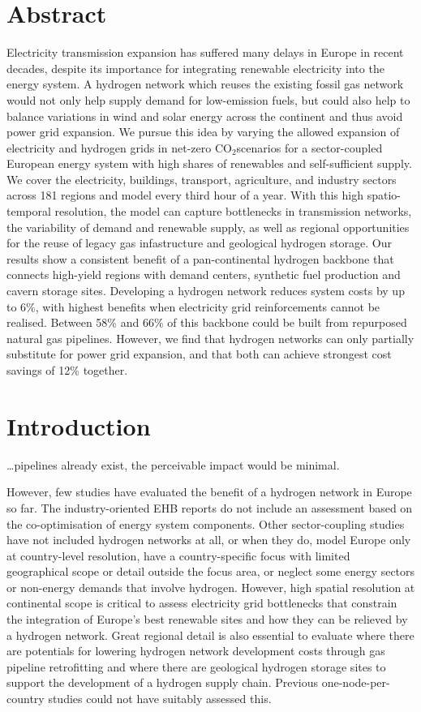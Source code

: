 \documentclass{article}
\def\co{CO${}_2$}
\begin{document}
\section*{Abstract}

Electricity transmission expansion has suffered many delays in Europe in recent
decades, despite its importance for integrating renewable electricity into the
energy system. A hydrogen network which reuses the existing fossil gas network
would not only help supply demand for low-emission fuels, but could also help to
balance variations in wind and solar energy across the continent and thus avoid
power grid expansion. We pursue this idea by varying the allowed expansion of
electricity and hydrogen grids in net-zero \co scenarios for a sector-coupled
European energy system with high shares of renewables and self-sufficient
supply. We cover the electricity, buildings, transport, agriculture, and
industry sectors across 181 regions and model every third hour of a year. With
this high spatio-temporal resolution, the model can capture bottlenecks in
transmission networks, the variability of demand and renewable supply, as well
as regional opportunities for the reuse of legacy gas infastructure and
geological hydrogen storage. Our results show a consistent benefit of a
pan-continental hydrogen backbone that connects high-yield regions with demand
centers, synthetic fuel production and cavern storage sites. Developing a
hydrogen network reduces system costs by up to 6\%, with highest benefits when
electricity grid reinforcements cannot be realised. Between 58\% and 66\% of
this backbone could be built from repurposed natural gas pipelines. However, we
find that hydrogen networks can only partially substitute for power grid
expansion, and that both can achieve strongest cost savings of 12\% together. 

\section*{Introduction}

\dots pipelines already exist, the perceivable impact would be minimal.

However, few studies have evaluated the benefit of a hydrogen network in Europe
so far. The industry-oriented EHB reports do not include an assessment based on
the co-optimisation of energy system components. Other sector-coupling studies
have not included hydrogen networks at all, or when they do, model Europe only
at country-level resolution, have a country-specific focus with limited
geographical scope or detail outside the focus area, or neglect some energy
sectors or non-energy demands that involve hydrogen. However, high spatial
resolution at continental scope is critical to assess electricity grid
bottlenecks that constrain the integration of Europe's best renewable sites and
how they can be relieved by a hydrogen network. Great regional detail is also
essential to evaluate where there are potentials for lowering hydrogen network
development costs through gas pipeline retrofitting and where there are
geological hydrogen storage sites to support the development of a hydrogen
supply chain. Previous one-node-per-country studies could not have suitably
assessed this.
\end{document}
